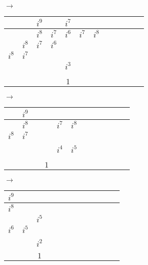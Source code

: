 \documentclass[12pt]{article}
\begin{document}
$\longrightarrow$
\begin{tabular}{|l|c|c|c|c|c|c|c|c|c|c|r|}
    \hline
    & & $i^9$ & & $i^7$ & & \\
    \hline
    & & $i^8$ & $i^7$ & $i^6$ & $i^7$ & $i^8$\\
    \hline
    & $i^8$ & $i^7$ & $i^6$ & & &\\
    \hline
    $i^8$ & $i^7$ & & & \color{red}{$i^4$} & &\\
    \hline
    & & & & $i^3$ & \color{red}{$i^4$} & \color{red}{$i^5$} \\
    \hline
    & & & & & & \\
    \hline
    & & & & & & \\
    \hline
    & & & & $1$ & & \\
    \hline
\end{tabular}
$\longrightarrow$
\begin{tabular}{|l|c|c|c|c|c|c|c|c|c|c|r|}
    \hline
    & $i^9$ & & & & \\
    \hline
    & $i^8$ & & & $i^7$ & $i^8$\\
    \hline
    $i^8$ & $i^7$ & & \color{red}{$i^5$} & &\\
    \hline
    & \color{red}{$i^6$} & \color{red}{$i^5$} & & &\\
    \hline
    & & & & $i^4$ & $i^5$ \\
    \hline
    & & & \color{red}{$i^2$} & & \\
    \hline
    & & & & & \\
    \hline
    & & & $1$ & & \\
    \hline
\end{tabular}
$\longrightarrow$
\begin{tabular}{|l|c|c|c|c|c|c|c|c|c|c|r|}
    \hline
    $i^9$ & &\\
    \hline
    $i^8$ & & \color{red}{$i^6$}\\
    \hline
    & \color{red}{$i^6$} & $i^5$\\
    \hline
    $i^6$ & $i^5$ &\\
    \hline
    & & \color{red}{$i^3$}\\
    \hline
    & & $i^2$\\
    \hline
    & &\\
    \hline
    & & $1$\\
    \hline
\end{tabular}
\end{document}

